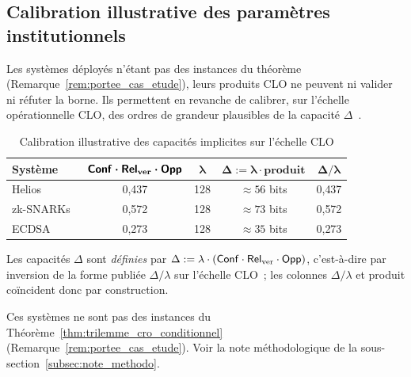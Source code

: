 \subsection{Calibration illustrative des param\`etres institutionnels}
\label{subsec:analyse_comparative}
\begin{sloppypar}
Les syst\`emes d\'eploy\'es n'\'etant pas des instances du th\'eor\`eme
(Remarque~\ref{rem:portee_cas_etude}), leurs produits CLO ne peuvent ni
valider ni r\'efuter la borne. Ils permettent en revanche de calibrer, sur
l'\'echelle op\'erationnelle CLO, des ordres de grandeur plausibles de la
capacit\'e $\Delta$~\cite{Adida08,Groth16,Johnson01}.

\begin{table}[htbp]
\centering
\caption{Calibration illustrative des capacit\'es implicites sur l'\'echelle CLO}
\label{tab:validation_cro_classique}
\begin{tabular}{@{}lcccc@{}}
\toprule
\textbf{Syst\`eme} & $\boldsymbol{\mathsf{Conf}\cdot\mathsf{Rel}_{\mathrm{ver}}\cdot\mathsf{Opp}}$ & $\boldsymbol{\lambda}$ & $\boldsymbol{\Delta := \lambda \cdot \text{produit}}$ & $\boldsymbol{\Delta/\lambda}$ \\
\midrule
Helios~\cite{Adida08,Adida09UCL} & 0{,}437 & 128 & $\approx 56$ bits & 0{,}437 \\
zk-SNARKs~\cite{Groth16,BCTV14} & 0{,}572 & 128 & $\approx 73$ bits & 0{,}572 \\
ECDSA~\cite{Johnson01,NIST.FIPS.186-5} & 0{,}273 & 128 & $\approx 35$ bits & 0{,}273 \\
\bottomrule
\end{tabular}
\begin{tablenotes}
\item \footnotesize Les capacit\'es $\Delta$ sont \emph{d\'efinies} par $\Delta := \lambda \cdot (\mathsf{Conf}\cdot\mathsf{Rel}_{\mathrm{ver}}\cdot\mathsf{Opp})$, c'est-\`a-dire par inversion de la forme publi\'ee $\Delta/\lambda$ sur l'\'echelle CLO~; les colonnes $\Delta/\lambda$ et produit co\"incident donc par construction.
\item \footnotesize Ces syst\`emes ne sont pas des instances du Th\'eor\`eme~\ref{thm:trilemme_cro_conditionnel} (Remarque~\ref{rem:portee_cas_etude}). Voir la note m\'ethodologique de la sous-section~\ref{subsec:note_methodo}.
\end{tablenotes}
\end{table}


\end{sloppypar}
